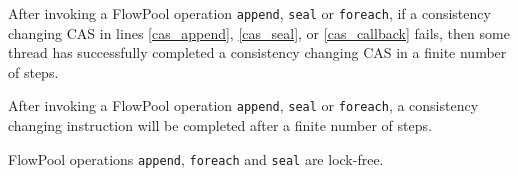 \begin{lemma}
After invoking a FlowPool operation \verb=append=, \verb=seal= or
\verb=foreach=, if a consistency changing CAS in lines
\ref{cas_append}, \ref{cas_seal}, or \ref{cas_callback} fails, then some thread
has successfully completed a consistency changing CAS in a finite number
of steps.
\end{lemma}

\begin{lemma}
After invoking a FlowPool operation \verb=append=, \verb=seal= or
\verb=foreach=, a consistency changing instruction will be completed after
a finite number of steps.
\end{lemma}


\begin{theorem}
FlowPool operations \verb=append=, \verb=foreach= and \verb=seal= are lock-free.
\end{theorem}


\smallrulenames

